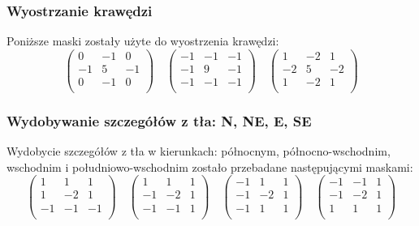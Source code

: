 \documentclass{classrep}
\begin{document}
\subsubsection{Wyostrzanie krawędzi}
Poniższe maski zostały użyte do wyostrzenia krawędzi:
\[
 \begin{pmatrix}
  0 & -1 & 0 \\
  -1 & 5 & -1 \\
  0 & -1 & 0 \\
 \end{pmatrix}
\quad
 \begin{pmatrix}
  -1 & -1 & -1 \\
  -1 & 9 & -1 \\
  -1 & -1 & -1 \\
 \end{pmatrix}
\quad
 \begin{pmatrix}
  1 & -2 & 1 \\
  -2 & 5 & -2 \\
  1 & -2 & 1 \\
 \end{pmatrix}
\]

\subsubsection{Wydobywanie szczegółów z tła: N, NE, E, SE}
Wydobycie szczegółów z tła w kierunkach: północnym, północno-wschodnim, wschodnim i południowo-wschodnim zostało przebadane następującymi maskami:
\[
 \begin{pmatrix}
  1 & 1 & 1 \\
  1 & -2 & 1 \\
  -1 & -1 & -1 \\
 \end{pmatrix}
\quad
 \begin{pmatrix}
  1 & 1 & 1 \\
  -1 & -2 & 1 \\
  -1 & -1 & 1 \\
 \end{pmatrix}
\quad
 \begin{pmatrix}
  -1 & 1 & 1 \\
  -1 & -2 & 1 \\
  -1 & 1 & 1 \\
 \end{pmatrix}
\quad
 \begin{pmatrix}
  -1 & -1 & 1 \\
  -1 & -2 & 1 \\
  1 & 1 & 1 \\
 \end{pmatrix}
\]
\end{document}
